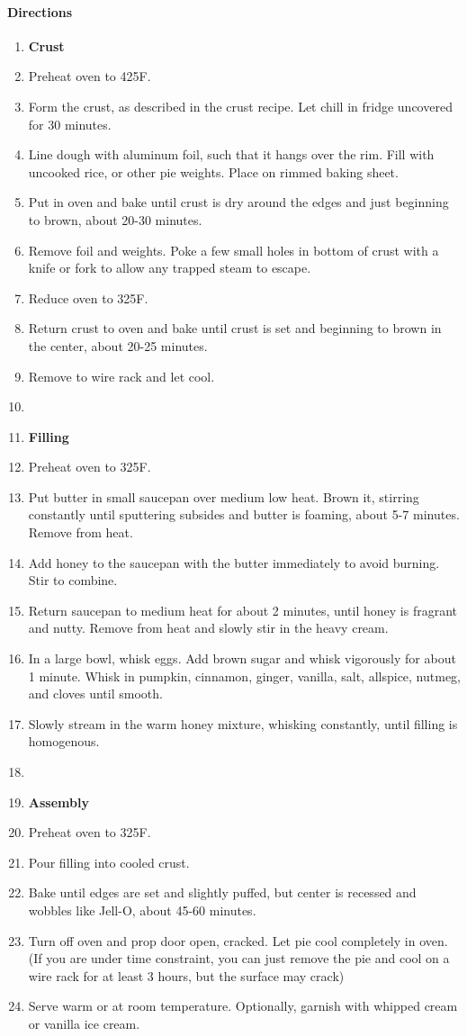 \documentclass[12pt]{article}
\newenvironment*{directions}
	{
		\paragraph*{Directions}
		\begin{enumerate}
	}
	{
		\end{enumerate}
	}
\begin{document}
	\begin{directions}
		\item[] \textbf{Crust}
		\item Preheat oven to 425F.
		\item Form the crust, as described in the crust recipe. Let chill in fridge uncovered for 30 minutes.
		\item Line dough with aluminum foil, such that it hangs over the rim. Fill with uncooked rice, or other pie weights. Place on rimmed baking sheet.
		\item Put in oven and bake until crust is dry around the edges and just beginning to brown, about 20-30 minutes.
		\item Remove foil and weights. Poke a few small holes in bottom of crust with a knife or fork to allow any trapped steam to escape.
		\item Reduce oven to 325F.
		\item Return crust to oven and bake until crust is set and beginning to brown in the center, about 20-25 minutes.
		\item Remove to wire rack and let cool.
		\item[] \hfill
		\item[] \textbf{Filling}
		\item Preheat oven to 325F.
		\item Put butter in small saucepan over medium low heat. Brown it, stirring constantly until sputtering subsides and butter is foaming, about 5-7 minutes. Remove from heat.
		\item Add honey to the saucepan with the butter immediately to avoid burning. Stir to combine.
		\item Return saucepan to medium heat for about 2 minutes, until honey is fragrant and nutty. Remove from heat and slowly stir in the heavy cream.
		\item In a large bowl, whisk eggs. Add brown sugar and whisk vigorously for about 1 minute. Whisk in pumpkin, cinnamon, ginger, vanilla, salt, allspice, nutmeg, and cloves until smooth.
		\item Slowly stream in the warm honey mixture, whisking constantly, until filling is homogenous.
		\item[] \hfill
		\item[] \textbf{Assembly}
		\item Preheat oven to 325F.
		\item Pour filling into cooled crust.
		\item Bake until edges are set and slightly puffed, but center is recessed and wobbles like Jell-O, about 45-60 minutes.
		\item Turn off oven and prop door open, cracked. Let pie cool completely in oven. (If you are under time constraint, you can just remove the pie and cool on a wire rack for at least 3 hours, but the surface may crack) \label{make_ahead:pumpkin_pie}
		\item Serve warm or at room temperature. Optionally, garnish with whipped cream or vanilla ice cream.
	\end{directions}
	
\end{document}
